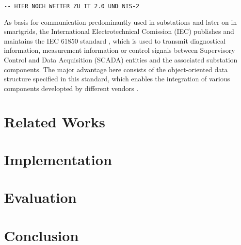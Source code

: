 \documentclass[conference]{IEEEtran}
\begin{document}
\begin{verbatim}
-- HIER NOCH WEITER ZU IT 2.0 UND NIS-2
\end{verbatim}

As basis for communication predominantly used in substations and later on in smartgrids, the International Electrotechnical Comission (IEC) publishes 
and maintains the IEC 61850 standard \cite{IEC61850:2023}, which is used to transmit diagnostical information, measurement information or control signals 
between Supervisory Control and Data Acquisition (SCADA) entities and the associated substation components. The major advantage here consists of the 
object-oriented data structure specified in this standard, which enables the integration of various components developted by different vendors 
\cite[p. 5643]{Review_IEC62351:2019}. 


\section{Related Works}


\section{Implementation}


\section{Evaluation}


\section{Conclusion}


\printbibliography
\end{document}
